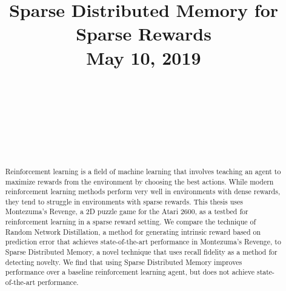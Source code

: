 \documentclass[journal, onecolumn, 12pt, draftclsnofoot]{IEEEtran}
\begin{document}
	\title{Sparse Distributed Memory for Sparse Rewards \\ May 10, 2019}

	\author{ \\
		 \\ \bigskip
		 \\
			 \\ \bigskip
		 \\
			 \\
			}

	\maketitle

	\newpage

	\begin{abstract}
		Reinforcement learning is a field of machine learning that involves teaching an agent to maximize rewards from the environment by choosing the best actions. While modern reinforcement learning methods perform very well in environments with dense rewards, they tend to struggle in environments with sparse rewards. This thesis uses Montezuma's Revenge, a 2D puzzle game for the Atari 2600, as a testbed for reinforcement learning in a sparse reward setting. We compare the technique of Random Network Distillation, a method for generating intrinsic reward based on prediction error that achieves state-of-the-art performance in Montezuma's Revenge, to Sparse Distributed Memory, a novel technique that uses recall fidelity as a method for detecting novelty. We find that using Sparse Distributed Memory improves performance over a baseline reinforcement learning agent, but does not achieve state-of-the-art performance.
	\end{abstract}

	\newpage
\end{document}
